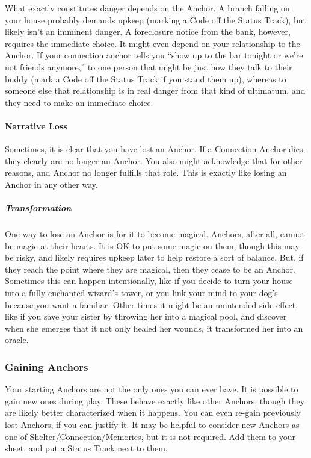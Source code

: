 \documentclass[
]{article}
\begin{document}
What exactly constitutes danger depends on the Anchor. A branch falling
on your house probably demands upkeep (marking a Code off the Status
Track), but likely isn't an imminent danger. A foreclosure notice from
the bank, however, requires the immediate choice. It might even depend
on your relationship to the Anchor. If your connection anchor tells you
``show up to the bar tonight or we're not friends anymore,'' to one
person that might be just how they talk to their buddy (mark a Code off
the Status Track if you stand them up), whereas to someone else that
relationship is in real danger from that kind of ultimatum, and they
need to make an immediate choice.

\hypertarget{narrative-loss}{%
\paragraph{Narrative Loss}\label{narrative-loss}}

Sometimes, it is clear that you have lost an Anchor. If a Connection
Anchor dies, they clearly are no longer an Anchor. You also might
acknowledge that for other reasons, and Anchor no longer fulfills that
role. This is exactly like losing an Anchor in any other way.

\hypertarget{transformation}{%
\subparagraph{Transformation}\label{transformation}}

One way to lose an Anchor is for it to become magical. Anchors, after
all, cannot be magic at their hearts. It is OK to put some magic on
them, though this may be risky, and likely requires upkeep later to help
restore a sort of balance. But, if they reach the point where they are
magical, then they cease to be an Anchor. Sometimes this can happen
intentionally, like if you decide to turn your house into a
fully-enchanted wizard's tower, or you link your mind to your dog's
because you want a familiar. Other times it might be an unintended side
effect, like if you save your sister by throwing her into a magical
pool, and discover when she emerges that it not only healed her wounds,
it transformed her into an oracle.

\hypertarget{gaining-anchors}{%
\subsubsection{Gaining Anchors}\label{gaining-anchors}}

Your starting Anchors are not the only ones you can ever have. It is
possible to gain new ones during play. These behave exactly like other
Anchors, though they are likely better characterized when it happens.
You can even re-gain previously lost Anchors, if you can justify it. It
may be helpful to consider new Anchors as one of
Shelter/Connection/Memories, but it is not required. Add them to your
sheet, and put a Status Track next to them.
\end{document}
